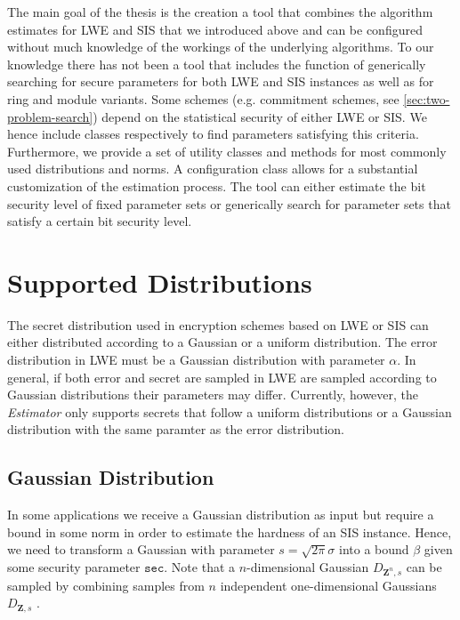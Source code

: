 The main goal of the thesis is the creation a tool that combines the algorithm estimates for LWE and SIS that we introduced above and can be configured without much knowledge of the workings of the underlying algorithms. To our knowledge there has not been a tool that includes the function of generically searching for secure parameters for both LWE and SIS instances as well as for ring and module variants. Some schemes (e.g. commitment schemes, see \cref{sec:two-problem-search}) depend on the statistical security of either LWE or SIS. We hence include classes respectively to find parameters satisfying this criteria. %
Furthermore, we provide a set of utility classes and methods for most commonly used distributions and norms.
A configuration class allows for a substantial customization of the estimation process.
The tool can either estimate the bit security level of fixed parameter sets or generically search for parameter sets that satisfy a certain bit security level.

\section{Supported Distributions} \label{sec:supported-distributions}%
The secret distribution used in encryption schemes based on LWE or SIS can either distributed according to a Gaussian or a uniform distribution. The error distribution in LWE must be a Gaussian distribution with parameter $\alpha$. In general, if both error and secret are sampled in LWE are sampled according to Gaussian distributions their parameters may differ. Currently, however, the \textit{Estimator} only supports secrets that follow a uniform distributions or a Gaussian distribution with the same paramter as the error distribution.

\subsection{Gaussian Distribution}
In some applications we receive a Gaussian distribution as input but require a bound in some norm in order to estimate the hardness of an SIS instance. Hence, we need to transform a Gaussian with parameter $s  = \sqrt{2 \pi} \sigma$ into a bound $\beta$ given some security parameter $\texttt{sec}$. Note that a $n$-dimensional Gaussian $D_{\mathbf{Z}^n, s}$ can be sampled by combining samples from $n$ independent one-dimensional Gaussians $D_{\mathbf{Z}, s}$ \cite{GJS15}. %

